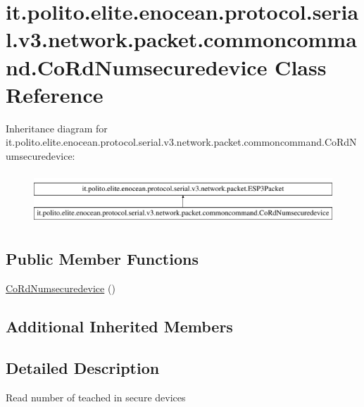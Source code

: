 \hypertarget{classit_1_1polito_1_1elite_1_1enocean_1_1protocol_1_1serial_1_1v3_1_1network_1_1packet_1_1common6fb957e7f7a5690155483692373a4fc5}{}\section{it.\+polito.\+elite.\+enocean.\+protocol.\+serial.\+v3.\+network.\+packet.\+commoncommand.\+Co\+Rd\+Numsecuredevice Class Reference}
\label{classit_1_1polito_1_1elite_1_1enocean_1_1protocol_1_1serial_1_1v3_1_1network_1_1packet_1_1common6fb957e7f7a5690155483692373a4fc5}
Inheritance diagram for it.\+polito.\+elite.\+enocean.\+protocol.\+serial.\+v3.\+network.\+packet.\+commoncommand.\+Co\+Rd\+Numsecuredevice\+:\begin{figure}[H]
\begin{center}
\leavevmode
\includegraphics[height=1.958042cm]{classit_1_1polito_1_1elite_1_1enocean_1_1protocol_1_1serial_1_1v3_1_1network_1_1packet_1_1common6fb957e7f7a5690155483692373a4fc5}
\end{center}
\end{figure}
\subsection*{Public Member Functions}
\begin{DoxyCompactItemize}
\item 
\hyperlink{classit_1_1polito_1_1elite_1_1enocean_1_1protocol_1_1serial_1_1v3_1_1network_1_1packet_1_1common6fb957e7f7a5690155483692373a4fc5_a9dd4b06e869ecfefb484a94d56be46f9}{Co\+Rd\+Numsecuredevice} ()
\end{DoxyCompactItemize}
\subsection*{Additional Inherited Members}


\subsection{Detailed Description}
Read number of teached in secure devices

